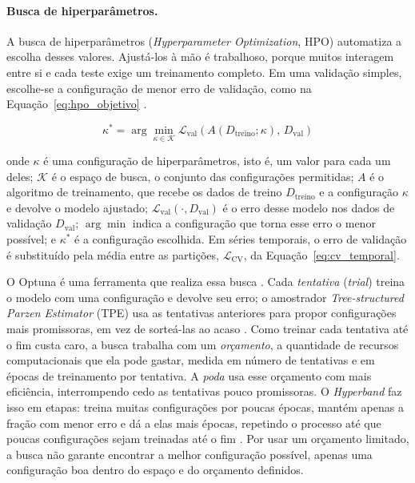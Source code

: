 \paragraph{Busca de hiperparâmetros.} A busca de hiperparâmetros (\textit{Hyperparameter Optimization}, HPO) automatiza a escolha desses valores. Ajustá-los à mão é trabalhoso, porque muitos interagem entre si e cada teste exige um treinamento completo. Em uma validação simples, escolhe-se a configuração de menor erro de validação, como na Equação~\ref{eq:hpo_objetivo} \cite{feurer2019hyperparameter}.

\begin{equation}
    \kappa^{*}
    =
    \arg\min_{\kappa \in \mathcal{K}}
    \mathcal{L}_{\mathrm{val}}\left(A(D_{\mathrm{treino}};\kappa),\, D_{\mathrm{val}}\right)
    \label{eq:hpo_objetivo}
\end{equation}

\noindent onde \(\kappa\) é uma configuração de hiperparâmetros, isto é, um valor para cada um deles; \(\mathcal{K}\) é o espaço de busca, o conjunto das configurações permitidas; \(A\) é o algoritmo de treinamento, que recebe os dados de treino \(D_{\mathrm{treino}}\) e a configuração \(\kappa\) e devolve o modelo ajustado; \(\mathcal{L}_{\mathrm{val}}(\cdot, D_{\mathrm{val}})\) é o erro desse modelo nos dados de validação \(D_{\mathrm{val}}\); \(\arg\min\) indica a configuração que torna esse erro o menor possível; e \(\kappa^{*}\) é a configuração escolhida. Em séries temporais, o erro de validação é substituído pela média entre as partições, \(\mathcal{L}_{\mathrm{CV}}\), da Equação~\ref{eq:cv_temporal}.

O Optuna é uma ferramenta que realiza essa busca \cite{akiba2019optuna}. Cada \emph{tentativa} (\textit{trial}) treina o modelo com uma configuração e devolve seu erro; o amostrador \textit{Tree-structured Parzen Estimator} (TPE) usa as tentativas anteriores para propor configurações mais promissoras, em vez de sorteá-las ao acaso \cite{bergstra2011algorithms,optunaDocsTPE2026}. Como treinar cada tentativa até o fim custa caro, a busca trabalha com um \emph{orçamento}, a quantidade de recursos computacionais que ela pode gastar, medida em número de tentativas e em épocas de treinamento por tentativa. A \emph{poda} usa esse orçamento com mais eficiência, interrompendo cedo as tentativas pouco promissoras. O \textit{Hyperband} faz isso em etapas: treina muitas configurações por poucas épocas, mantém apenas a fração com menor erro e dá a elas mais épocas, repetindo o processo até que poucas configurações sejam treinadas até o fim \cite{li2018hyperband}. Por usar um orçamento limitado, a busca não garante encontrar a melhor configuração possível, apenas uma configuração boa dentro do espaço e do orçamento definidos.

